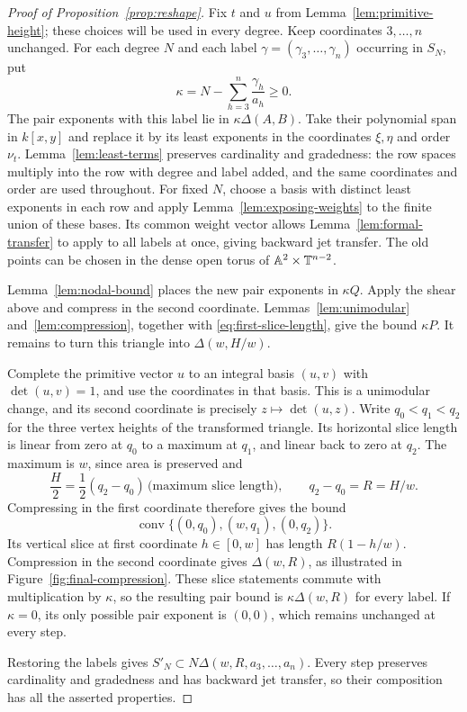 \begin{proof}[Proof of Proposition~\ref{prop:reshape}]
Fix $t$ and $u$ from Lemma~\ref{lem:primitive-height}; these choices will
be used in every degree.  Keep coordinates $3,\ldots,n$ unchanged.
For each degree $N$ and each label
$\gamma=(\gamma_3,\ldots,\gamma_n)$ occurring in $S_N$, put
\[
 \kappa=N-\sum_{h=3}^n\frac{\gamma_h}{a_h}\ge0.
\]
The pair exponents with this label lie in $\kappa\Delta(A,B)$.
Take their polynomial span in $k[x,y]$ and replace it by its least
exponents in the coordinates $\xi,\eta$ and order $\nu_t$.
Lemma~\ref{lem:least-terms} preserves cardinality and gradedness: the row
spaces multiply into the row with degree and label added, and the same
coordinates and order are used throughout.  For fixed $N$, choose a basis
with distinct least exponents in each row and apply
Lemma~\ref{lem:exposing-weights} to the finite union of these bases.
Its common weight vector allows Lemma~\ref{lem:formal-transfer} to apply
to all labels at once, giving backward jet transfer.  The old points can
be chosen in the dense open torus of $\mathbb A^2\times\mathbb T^{n-2}$.

Lemma~\ref{lem:nodal-bound} places the new pair exponents in $\kappa Q$.
Apply the shear above and compress in the second coordinate.
Lemmas~\ref{lem:unimodular} and~\ref{lem:compression}, together with
\eqref{eq:first-slice-length}, give the bound $\kappa P$.
It remains to turn this triangle into $\Delta(w,H/w)$.

Complete the primitive vector $u$ to an integral basis $(u,v)$ with
$\det(u,v)=1$, and use the coordinates in that basis.  This is a
unimodular change, and its second coordinate is precisely
$z\mapsto\det(u,z)$.  Write $q_0<q_1<q_2$ for the three vertex heights of
the transformed triangle.  Its horizontal slice length is linear from
zero at $q_0$ to a maximum at $q_1$, and linear back to zero at $q_2$.
The maximum is $w$, since area is preserved and
\[
 \frac H2=\frac12(q_2-q_0)\,\bigl(\text{maximum slice length}\bigr),
 \qquad q_2-q_0=R=H/w.
\]
Compressing in the first coordinate therefore gives the bound
\[
 \operatorname{conv}\{(0,q_0),(w,q_1),(0,q_2)\}.
\]
Its vertical slice at first coordinate $h\in[0,w]$ has length
$R(1-h/w)$.  Compression in the second coordinate gives
$\Delta(w,R)$, as illustrated in Figure~\ref{fig:final-compression}.  These slice statements commute with multiplication by
$\kappa$, so the resulting pair bound is $\kappa\Delta(w,R)$ for every
label.  If $\kappa=0$, its only possible pair exponent is $(0,0)$, which
remains unchanged at every step.

Restoring the labels gives
$S'_N\subset N\Delta(w,R,a_3,\ldots,a_n)$.  Every step preserves
cardinality and gradedness and has backward jet transfer, so their
composition has all the asserted properties.
\end{proof}


